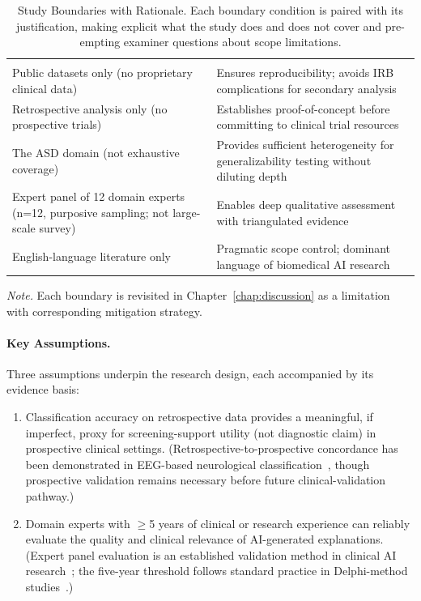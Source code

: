 {\tablestripes\tablefontsize
\begin{xltabular}{\textwidth}{@{} L L @{}}
\caption[Study Boundaries with Rationale]{Study Boundaries with Rationale. Each boundary condition is paired with its justification, making explicit what the study does and does not cover and pre-empting examiner questions about scope limitations.}\label{tab:study_boundaries} \\
\toprule
{} &  \\
\midrule
\endfirsthead
\toprule
{} &  \\
\midrule
\endhead
\bottomrule
\endlastfoot
Public datasets only (no proprietary clinical data) & Ensures reproducibility; avoids IRB complications for secondary analysis \\
\addlinespace
Retrospective analysis only (no prospective trials) & Establishes proof-of-concept before committing to clinical trial resources \\
\addlinespace
The ASD domain (not exhaustive coverage) & Provides sufficient heterogeneity for generalizability testing without diluting depth \\
\addlinespace
Expert panel of 12 domain experts (n=12, purposive sampling; not large-scale survey) & Enables deep qualitative assessment with triangulated evidence \\
\addlinespace
English-language literature only & Pragmatic scope control; dominant language of biomedical AI research \\
\end{xltabular}}
\vspace{0.5em}
\noindent\textit{Note.} Each boundary is revisited in Chapter~\ref{chap:discussion} as a limitation with corresponding mitigation strategy.

\paragraph{Key Assumptions.}
Three assumptions underpin the research design, each accompanied by its evidence basis:
\begin{enumerate}
    \item Classification accuracy on retrospective data provides a meaningful, if imperfect, proxy for screening-support utility (not diagnostic claim) in prospective clinical settings. (Retrospective-to-prospective concordance has been demonstrated in EEG-based neurological classification~\cite{acharya2018deep, boonyakitanont2020review}, though prospective validation remains necessary before future clinical-validation pathway.)
    \item Domain experts with $\geq$5 years of clinical or research experience can reliably evaluate the quality and clinical relevance of AI-generated explanations. (Expert panel evaluation is an established validation method in clinical AI research~\cite{tonekaboni2019clinicians}; the five-year threshold follows standard practice in Delphi-method studies~\cite{hsu2007delphi}.)
\end{enumerate}

